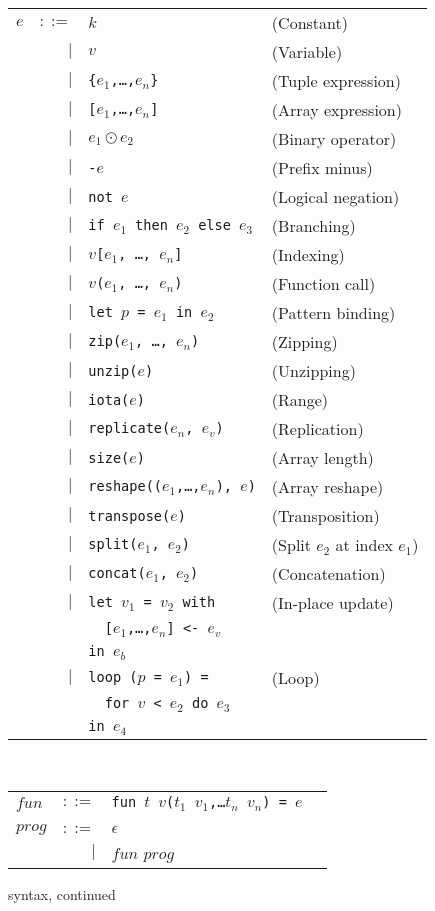 \begin{figure}[bt]
\begin{tabular}{lrll}
$e$ & $::=$ & $k$ & (Constant)\\
& $|$ & $v$ & (Variable)\\
& $|$ & \texttt{\{$e_{1}$,\ldots,$e_{n}$\}} & (Tuple expression) \\
& $|$ & \texttt{[$e_{1}$,\ldots,$e_{n}$]} & (Array expression) \\
& $|$ & $e_{1} \odot{} e_{2}$ & (Binary operator) \\
& $|$ & \texttt{-$e$} & (Prefix minus) \\
& $|$ & \texttt{not $e$} & (Logical negation) \\
& $|$ & \texttt{if $e_{1}$ then $e_{2}$ else $e_{3}$} & (Branching) \\
& $|$ & \texttt{$v$[$e_{1}$, \ldots, $e_{n}$]} & (Indexing) \\
& $|$ & \texttt{$v$($e_{1}$, \ldots, $e_{n}$)} & (Function call) \\
& $|$ & \texttt{let $p$ = $e_{1}$ in $e_{2}$} & (Pattern binding) \\
& $|$ & \texttt{zip($e_{1}$, \ldots, $e_{n}$)} & (Zipping) \\
& $|$ & \texttt{unzip($e$)} & (Unzipping) \\
& $|$ & \texttt{iota($e$)} & (Range) \\
& $|$ & \texttt{replicate($e_{n}$, $e_{v}$)} & (Replication) \\
& $|$ & \texttt{size($e$)} & (Array length) \\
& $|$ & \texttt{reshape(($e_{1}$,\ldots,$e_{n}$), $e$)} & (Array reshape) \\
& $|$ & \texttt{transpose($e$)} & (Transposition) \\
& $|$ & \texttt{split($e_{1}$, $e_{2}$)} & (Split $e_{2}$ at index $e_{1}$) \\
& $|$ & \texttt{concat($e_{1}$, $e_{2}$)} & (Concatenation) \\
& $|$ & \texttt{let $v_{1}$ = $v_{2}$ with} & (In-place update) \\
&     & \texttt{\ \ [$e_{1}$,\ldots,$e_{n}$] <- $e_{v}$} \\
&     & \texttt{in $e_{b}$} \\
& $|$ & \texttt{loop ($p$ = $e_{1}$) =} & (Loop) \\
&     & \texttt{\ \ for $v$ < $e_{2}$ do $e_{3}$} \\
&     & \texttt{in $e_{4}$} \\
\end{tabular}
\\
\begin{tabular}{lrll}
$fun$ & $::=$ & \texttt{fun $t$ $v$($t_{1}$ $v_{1}$,\ldots $t_{n}$ $v_{n}$) = $e$} \\
\\
$prog$ & $::=$ & $\epsilon$ \\
       & $|$   & $fun$ $prog$
\end{tabular}
\caption{\LO{} syntax, continued}
\label{fig:fo-syntax-continued}
\end{figure}

